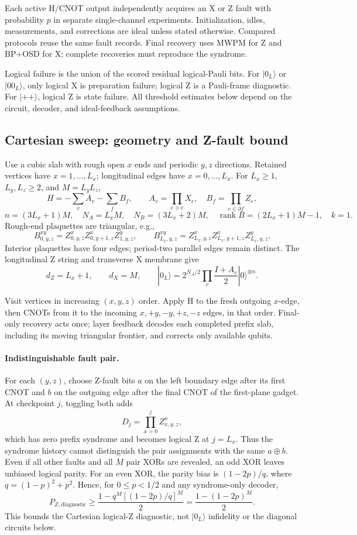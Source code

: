 \documentclass[11pt]{article}
\theoremstyle{definition}
\begin{document}
Each active H/CNOT output independently acquires an X or Z fault with
probability $p$ in separate single-channel experiments. Initialization,
idles, measurements, and corrections are ideal unless stated otherwise.
Compared protocols reuse the same fault records. Final recovery uses
MWPM for Z and BP+OSD for X; complete recoveries must reproduce the syndrome.

Logical failure is the union of the scored residual logical-Pauli bits.
For $|0_L\rangle$ or $|00_L\rangle$, only logical X is preparation failure;
logical Z is a Pauli-frame diagnostic. For $|++\rangle$, logical Z is
state failure. All threshold estimates below depend on the circuit,
decoder, and ideal-feedback assumptions.

\subsection{Cartesian sweep: geometry and Z-fault bound}

Use a cubic slab with rough open $x$ ends and periodic $y,z$ directions.
Retained vertices have $x=1,\ldots,L_x$; longitudinal edges have
$x=0,\ldots,L_x$. For $L_x\geq1$, $L_y,L_z\geq2$, and $M=L_yL_z$,
\[
 H=-\sum_v A_v-\sum_f B_f,\qquad
 A_v=\prod_{e\ni v}X_e,\quad B_f=\prod_{e\in\partial f}Z_e,
\]
\[
 n=(3L_x+1)M,\quad N_A=L_xM,\quad N_B=(3L_x+2)M,\quad
 \operatorname{rank}B=(2L_x+1)M-1,\quad k=1.
\]
Rough-end plaquettes are triangular, e.g.,
\[
 B^{xy}_{0,y,z}=Z^x_{0,y,z}Z^x_{0,y+1,z}Z^y_{1,y,z},\qquad
 B^{xy}_{L_x,y,z}=Z^x_{L_x,y,z}Z^x_{L_x,y+1,z}Z^y_{L_x,y,z}.
\]
Interior plaquettes have four edges; period-two parallel edges remain
distinct. The longitudinal Z string and transverse X membrane give
\[
 d_Z=L_x+1,\qquad d_X=M,\qquad
 |0_L\rangle=2^{N_A/2}\prod_v\frac{I+A_v}{2}|0\rangle^{\otimes n}.
\]

Visit vertices in increasing $(x,y,z)$ order. Apply H to the fresh outgoing
$x$-edge, then CNOTs from it to the incoming $x,+y,-y,+z,-z$ edges, in
that order. Final-only recovery acts once; layer feedback decodes each
completed prefix slab, including its moving triangular frontier, and
corrects only available qubits.

\paragraph{Indistinguishable fault pair.}
For each $(y,z)$, choose Z-fault bits $a$ on the left boundary edge after
its first CNOT and $b$ on the outgoing edge after the final CNOT of the
first-plane gadget. At checkpoint $j$, toggling both adds
\[
 D_j=\prod_{x=0}^{j}Z^x_{x,y,z},
\]
which has zero prefix syndrome and becomes logical Z at $j=L_x$.
Thus the syndrome history cannot distinguish the pair assignments with
the same $a\oplus b$. Even if all other faults and all $M$ pair XORs are
revealed, an odd XOR leaves unbiased logical parity. For an even XOR,
the parity bias is $(1-2p)/q$, where $q=(1-p)^2+p^2$. Hence, for
$0\leq p<1/2$ and any syndrome-only decoder,
\[
 P_{Z,\mathrm{diagnostic}}\geq
 \frac{1-q^M[(1-2p)/q]^M}{2}
 =\frac{1-(1-2p)^M}{2}.
\]
This bounds the Cartesian logical-Z diagnostic, not $|0_L\rangle$
infidelity or the diagonal circuits below.
\end{document}

